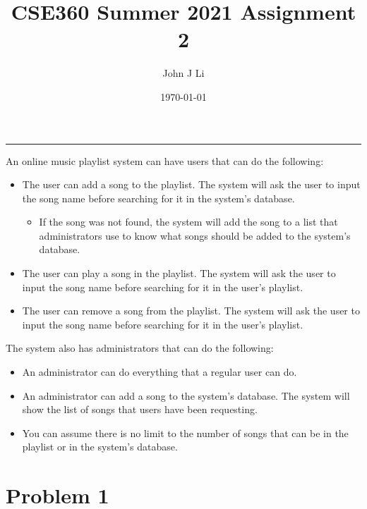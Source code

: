 \documentclass{article}
\title{CSE360 Summer 2021 Assignment 2}
\date{\today}
\author{John J Li}
\begin{document}
    \maketitle
    \thispagestyle{empty}
    \noindent\rule{\textwidth}{0.8pt}

    An online music playlist system can have users that can do the following:
    \begin{itemize}
        \item 
        The user can add a song to the playlist. The system will ask the user to input the song
        name before searching for it in the system’s database.
        \begin{itemize}
            \item 
            If the song was not found, the system will add the song to a list that
            administrators use to know what songs should be added to the system’s
            database.
        \end{itemize}
        \item
        The user can play a song in the playlist. The system will ask the user to input the song
        name before searching for it in the user’s playlist.
        \item
        The user can remove a song from the playlist. The system will ask the user to input the
        song name before searching for it in the user’s playlist.
    \end{itemize}

    The system also has administrators that can do the following:
    \begin{itemize}
        \item 
        An administrator can do everything that a regular user can do.
        \item
        An administrator can add a song to the system’s database. The system will show the list
        of songs that users have been requesting.
        \item
        You can assume there is no limit to the number of songs that can be in the playlist or in the
        system’s database.
    \end{itemize}


    \section*{Problem 1}
\end{document}
